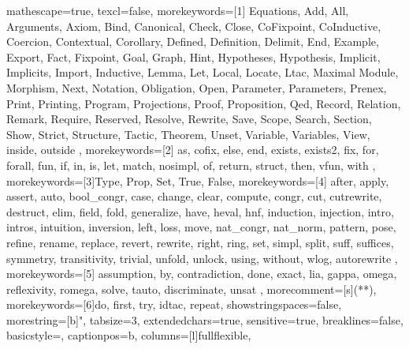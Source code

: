 
 {
mathescape=true,						
texcl=false,
morekeywords=[1]{
  Equations,
  Add,
  All,
  Arguments,
  Axiom,
  Bind,
  Canonical,
  Check,
  Close,
  CoFixpoint,
  CoInductive,
  Coercion,
  Contextual,
  Corollary,
  Defined,
  Definition,
  Delimit,
  End,
  Example,
  Export,
  Fact,
  Fixpoint,
  Goal,
  Graph,
  Hint,
  Hypotheses,
  Hypothesis,
  Implicit,
  Implicits,
  Import,
  Inductive,
  Lemma,
  Let,
  Local,
  Locate,
  Ltac,
  Maximal
  Module,
  Morphism,
  Next,
  Notation,
  Obligation,
  Open,
  Parameter,
  Parameters,
  Prenex,
  Print,
  Printing,
  Program,
  Projections,
  Proof,
  Proposition,
  Qed,
  Record,
  Relation,
  Remark,
  Require,
  Reserved,
  Resolve,
  Rewrite,
  Save,
  Scope,
  Search,
  Section,
  Show,
  Strict,
  Structure,
  Tactic,
  Theorem,
  Unset,
  Variable,
  Variables,
  View,
  inside,
  outside
},
morekeywords=[2]{
  as,
  cofix,
  else,
  end,
  exists,
  exists2,
  fix,
  for,
  forall,
  fun,
  if,
  in,
  is,
  let,
  match,
  nosimpl,
  of,
  return,
  struct,
  then,
  vfun,
  with
},
morekeywords=[3]{Type, Prop, Set, True, False},
morekeywords=[4]{
  after,
  apply,
  assert,
  auto,
  bool_congr,
  case,
  change,
  clear,
  compute,
  congr,
  cut,
  cutrewrite,
  destruct,
  elim,
  field,
  fold,
  generalize,
  have,
  heval, 
  hnf,
  induction,
  injection,
  intro,
  intros,
  intuition,
  inversion,
  left,
  loss,
  move,
  nat_congr,
  nat_norm,
  pattern,
  pose,
  refine,
  rename,
  replace,
  revert,
  rewrite,
  right,
  ring,
  set,
  simpl,
  split,
  suff,
  suffices,
  symmetry,
  transitivity,
  trivial,
  unfold,
  unlock,
  using,
  without,
  wlog,
  autorewrite
},        
morekeywords=[5]{
  assumption,
  by,
  contradiction,
  done,
  exact,
  lia,
  gappa,
  omega,
  reflexivity,
  romega,
  solve,
  tauto,
  discriminate,
  unsat
},
morecomment=[s]{(*}{*)},
morekeywords=[6]{do, first, try, idtac, repeat},
showstringspaces=false,
morestring=[b]",
tabsize=3,							
extendedchars=true,  		 		
sensitive=true, 
breaklines=false,
basicstyle=\footnotesize\ttfamily,
captionpos=b,							
columns=[l]fullflexible,
}
